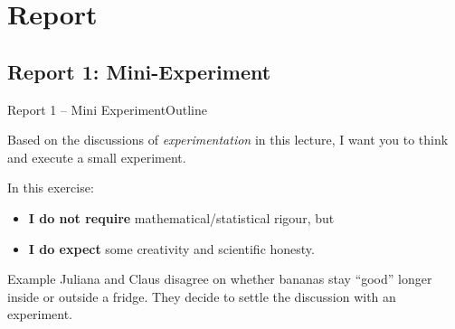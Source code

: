 \documentclass[t]{beamer}
\begin{document}
\section{Report}
\subsection{Report 1: Mini-Experiment}
\begin{ftst}
  {Report 1 -- Mini Experiment}{Outline}

  Based on the discussions of \emph{experimentation} in this lecture,
  I want you to think and execute a small experiment.

  \vone

  In this exercise:
  \begin{itemize}
    \item {\bf I do not require} mathematical/statistical
      rigour, but
    \item {\bf I do expect} some creativity and scientific
      honesty.
  \end{itemize}

  \vone

  \begin{block}{Example}
    Juliana and Claus disagree on whether bananas stay ``good'' longer
    inside or outside a fridge. They decide to settle the discussion
    with an experiment.
  \end{block}
\end{ftst}
\end{document}
